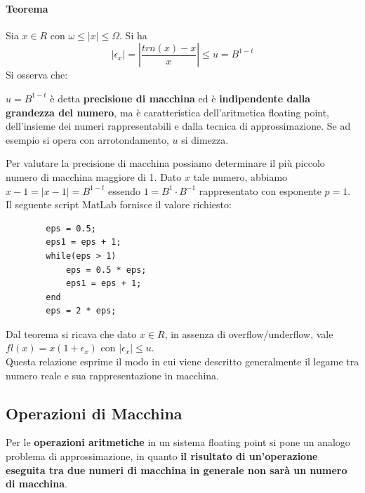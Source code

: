 \documentclass[10pt]{book}
\begin{document}
\paragraph{Teorema} Sia $x \in R$ con $\omega \leq |x| \leq \Omega$. Si ha $$|\epsilon_x| = |\frac{trn(x) - x}{x}| \leq u = B^{1-t}$$
Si osserva che:
\begin{list}{}{}
	\item $u = B^{1-t}$ è detta \textbf{precisione di macchina} ed è \textbf{indipendente dalla grandezza del numero}, ma è caratteristica dell'aritmetica floating point, dell'insieme dei numeri rappresentabili e dalla tecnica di approssimazione. Se ad esempio si opera con arrotondamento, $u$ si dimezza.
	\item Per valutare la precisione di macchina possiamo determinare il più piccolo numero di macchina maggiore di 1. Dato $x$ tale numero, abbiamo $x - 1 = |x - 1| = B^{1-t}$ essendo $1 = B^1 \cdot B^{-1}$ rappresentato con esponente $p = 1$. Il seguente script MatLab fornisce il valore richiesto:
	\begin{lstlisting}
		eps = 0.5;
		eps1 = eps + 1;
		while(eps > 1)
			eps = 0.5 * eps;
			eps1 = eps + 1;
		end
		eps = 2 * eps;
	\end{lstlisting}
	\item Dal teorema si ricava che dato $x \in R$, in assenza di overflow/underflow, vale $fl(x) = x(1 + \epsilon_x)$ con $|\epsilon_x| \leq u$.\\
	Questa relazione esprime il modo in cui viene descritto generalmente il legame tra numero reale e sua rappresentazione in macchina.
\end{list}
\subsection{Operazioni di Macchina}
Per le \textbf{operazioni aritmetiche} in un sistema floating point si pone un analogo problema di approssimazione, in quanto \textbf{il risultato di un'operazione eseguita tra due numeri di macchina in generale non sarà un numero di macchina}.
\end{document}
